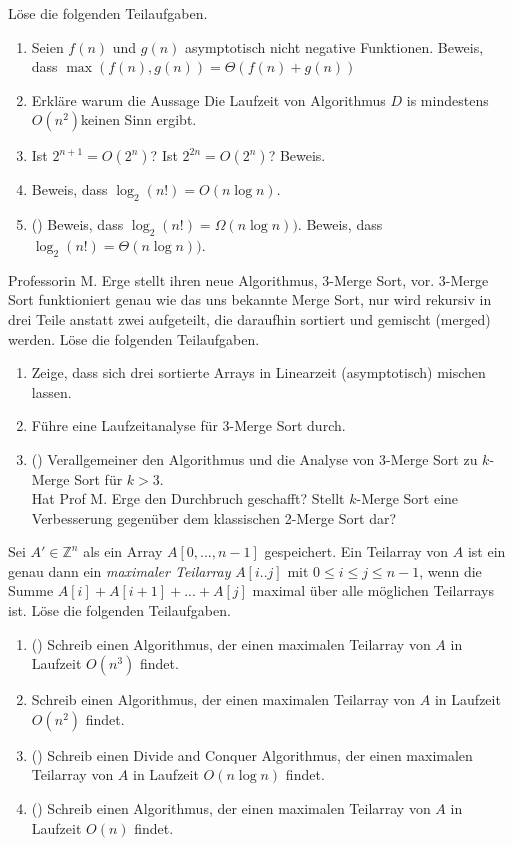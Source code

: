 \documentclass{uebung_cs}
\begin{document}
\begin{aufgabe}
	Löse die folgenden Teilaufgaben.
	\begin{enumerate}
		\item Seien $f(n)$ und $g(n)$ asymptotisch nicht negative Funktionen.
		Beweis, dass $\max(f(n),g(n)) = \Theta(f(n) + g(n))$
		\item Erkläre warum die Aussage \glqq Die Laufzeit von Algorithmus $D$ is mindestens $O(n^2)$\grqq keinen Sinn ergibt.
		\item Ist $2^{n+1} = O(2^n)$? Ist $2^{2n} = O(2^n)$? Beweis.
		\item Beweis, dass $\log_2(n!) = O(n \log n)$.
		\item (\hard) Beweis, dass $\log_2(n!) = \Omega(n\log n))$. Beweis, dass $\log_2(n!) = \Theta(n\log n))$.
	\end{enumerate}
\end{aufgabe}

\begin{aufgabe}
	Professorin M. Erge stellt ihren neue Algorithmus, 3-Merge Sort, vor.
	3-Merge Sort funktioniert genau wie das uns bekannte Merge Sort, nur wird rekursiv in drei Teile anstatt zwei aufgeteilt, die daraufhin sortiert und gemischt (merged) werden.
	Löse die folgenden Teilaufgaben.
	\begin{enumerate}
		\item Zeige, dass sich drei sortierte Arrays in Linearzeit (asymptotisch) mischen lassen.
		\item Führe eine Laufzeitanalyse für 3-Merge Sort durch.
		\item (\hard) Verallgemeiner den Algorithmus und die Analyse von 3-Merge Sort zu $k$-Merge Sort für $k>3$.\\
		Hat Prof M. Erge den Durchbruch geschafft?
		Stellt $k$-Merge Sort eine Verbesserung gegenüber dem klassischen 2-Merge Sort dar?
	\end{enumerate}
\end{aufgabe}

\begin{aufgabe}
	Sei $A' \in \mathbb{Z}^n$ als ein Array $A[0, ..., n-1]$ gespeichert.
	Ein Teilarray von $A$ ist ein genau dann ein \textit{maximaler Teilarray} $A[i..j]$ mit $0\leq i\leq j\leq n-1$, wenn die Summe $A[i] + A[i+1] + ... + A[j]$ maximal über alle möglichen Teilarrays ist.
	Löse die folgenden Teilaufgaben.
	\begin{enumerate}
		\item (\warmup) Schreib einen Algorithmus, der einen maximalen Teilarray von $A$ in Laufzeit $O(n^3)$ findet.
		\item Schreib einen Algorithmus, der einen maximalen Teilarray von $A$ in Laufzeit $O(n^2)$ findet.
		\item (\hard) Schreib einen Divide and Conquer Algorithmus, der einen maximalen Teilarray von $A$ in Laufzeit $O(n\log n)$ findet.
		\item (\veryhard) Schreib einen Algorithmus, der einen maximalen Teilarray von $A$ in Laufzeit $O(n)$ findet.
	\end{enumerate}
\end{aufgabe}
\end{document}
